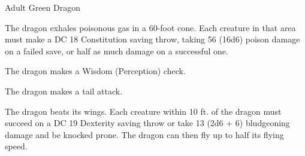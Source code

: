 \begin{monsterbox}{Adult Green Dragon}
\begin{monsteraction}
\end{monsteraction}
\begin{monsteraction}
The dragon exhales poisonous gas in a 60-foot cone. Each creature in that area must make a DC 18 Constitution saving throw, taking 56 (16d6) poison damage on a failed save, or half as much damage on a successful one.
\end{monsteraction}
\begin{monsteraction}[Detect]
The dragon makes a Wisdom (Perception) check.
\end{monsteraction}
\begin{monsteraction}
The dragon makes a tail attack.
\end{monsteraction}
\begin{monsteraction}
The dragon beats its wings. Each creature within 10 ft. of the dragon must succeed on a DC 19 Dexterity saving throw or take 13 (2d6 + 6) bludgeoning damage and be knocked prone. The dragon can then fly up to half its flying speed.
\end{monsteraction}
\end{monsterbox}